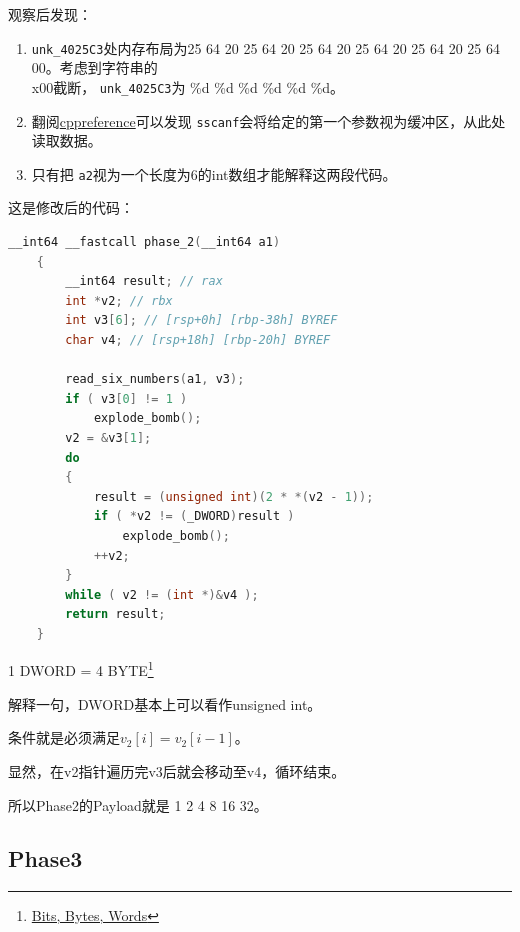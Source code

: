 \documentclass[a4pper,12pt,onecolumn]{article}
\begin{document}
观察后发现：

\begin{enumerate}
    \item  \texttt{unk\_4025C3}处内存布局为25 64 20 25 64 20 25 64 20 25 64 20 25 64 20 25 64 00。考虑到字符串的 \\x00截断， \texttt{unk\_4025C3}为 \%d \%d \%d \%d \%d \%d。
    \item 翻阅\href{https://en.cppreference.com/w/c/io/fscanf}{cppreference}可以发现 \texttt{sscanf}会将给定的第一个参数视为缓冲区，从此处读取数据。
    \item 只有把 \texttt{a2}视为一个长度为6的int数组才能解释这两段代码。
\end{enumerate}

这是修改后的代码：
\begin{lstlisting}[language=c, caption=Discompile by IDA Pro]
    __int64 __fastcall phase_2(__int64 a1)
    {
        __int64 result; // rax
        int *v2; // rbx
        int v3[6]; // [rsp+0h] [rbp-38h] BYREF
        char v4; // [rsp+18h] [rbp-20h] BYREF

        read_six_numbers(a1, v3);
        if ( v3[0] != 1 )
            explode_bomb();
        v2 = &v3[1];
        do
        {
            result = (unsigned int)(2 * *(v2 - 1));
            if ( *v2 != (_DWORD)result )
                explode_bomb();
            ++v2;
        }
        while ( v2 != (int *)&v4 );
        return result;
    }
\end{lstlisting}

1 DWORD = 4 BYTE\footnote{\href{https://www.cs.uaf.edu/2004/fall/cs301/notes/node15.html}{Bits, Bytes, Words}}

解释一句，DWORD基本上可以看作unsigned int。

条件就是必须满足$ v_2[i] = v_2[i-1] $。

显然，在v2指针遍历完v3后就会移动至v4，循环结束。

所以Phase2的Payload就是 1 2 4 8 16 32。

\subsection{Phase3}
\end{document}
